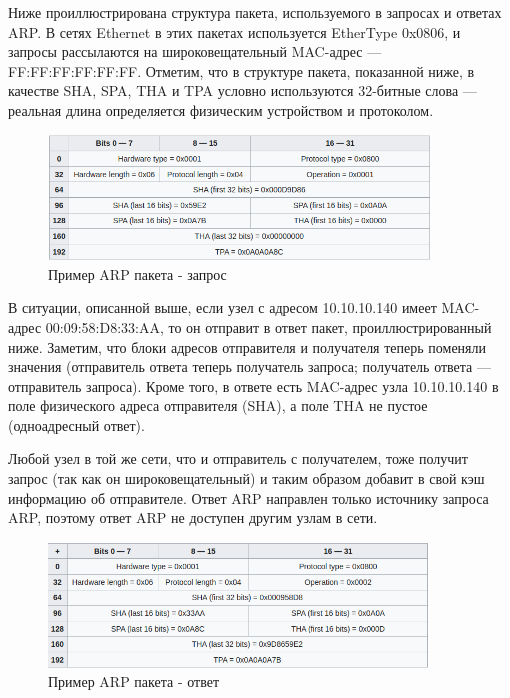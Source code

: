 Ниже проиллюстрирована структура пакета, используемого в запросах и ответах ARP. В сетях Ethernet в этих пакетах используется EtherType 0x0806, и запросы рассылаются на широковещательный MAC-адрес — FF:FF:FF:FF:FF:FF. Отметим, что в структуре пакета, показанной ниже, в качестве SHA, SPA, THA и TPA условно используются 32-битные слова — реальная длина определяется физическим устройством и протоколом.

\begin{figure}[h]
	\centering
	\includegraphics[width=0.9\textwidth]{image/arp2}
	\caption{Пример ARP пакета - запрос}
	\label{ARP_req}
\end{figure}

В ситуации, описанной выше, если узел с адресом 10.10.10.140 имеет MAC-адрес 00:09:58:D8:33:AA, то он отправит в ответ пакет, проиллюстрированный ниже. Заметим, что блоки адресов отправителя и получателя теперь поменяли значения (отправитель ответа теперь получатель запроса; получатель ответа — отправитель запроса). Кроме того, в ответе есть MAC-адрес узла 10.10.10.140 в поле физического адреса отправителя (SHA), а поле THA не пустое (одноадресный ответ).

Любой узел в той же сети, что и отправитель с получателем, тоже получит запрос (так как он широковещательный) и таким образом добавит в свой кэш информацию об отправителе. Ответ ARP направлен только источнику запроса ARP, поэтому ответ ARP не доступен другим узлам в сети.

\begin{figure}[h]
	\centering
	\includegraphics[width=0.9\textwidth]{image/arp1}
	\caption{Пример ARP пакета - ответ}
	\label{ARP_Response}
\end{figure}

